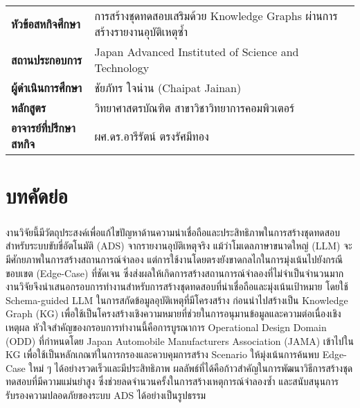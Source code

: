 \documentclass[a4paper,12pt]{report}
\begin{document}
{
\cleardoublepage%
\let\clearpage\relax%
\noindent
\begin{tabular}{l p{10cm}}
    \textbf{หัวข้อสหกิจศึกษา} & การสร้างชุดทดสอบเสริมด้วย Knowledge Graphs ผ่านการสร้างรายงานอุบัติเหตุซ้ำ \vspace{0.2cm} \\
    \textbf{สถานประกอบการ} & Japan Advanced Instituted of Science and Technology \vspace{0.2cm}\\
    \textbf{ผู้ดำเนินการศึกษา} & ชัยภัทร ใจน่าน (Chaipat Jainan) \vspace{0.2cm}\\
    \textbf{หลักสูตร} & วิทยาศาสตรบัณฑิต สาขาวิชาวิทยาการคอมพิวเตอร์ \vspace{0.2cm}\\
    \textbf{อาจารย์ที่ปรึกษาสหกิจ} & ผศ.ดร.อารีรัตน์ ตรงรัศมีทอง \vspace{0.2cm}\\
\end{tabular}

\chapter*{บทคัดย่อ}

\paragraph{}
งานวิจัยนี้มีวัตถุประสงค์เพื่อแก้ไขปัญหาด้านความน่าเชื่อถือและประสิทธิภาพในการสร้างชุดทดสอบสำหรับระบบขับขี่อัตโนมัติ (ADS) จากรายงานอุบัติเหตุจริง แม้ว่าโมเดลภาษาขนาดใหญ่ (LLM) จะมีศักยภาพในการสร้างสถานการณ์จำลอง แต่การใช้งานโดยตรงยังขาดกลไกในการมุ่งเน้นไปยังกรณีขอบเขต (Edge-Case) ที่ชัดเจน ซึ่งส่งผลให้เกิดการสร้างสถานการณ์จำลองที่ไม่จำเป็นจำนวนมาก งานวิจัยจึงนำเสนอกรอบการทำงานสำหรับการสร้างชุดทดสอบที่น่าเชื่อถือและมุ่งเน้นเป้าหมาย โดยใช้ Schema-guided LLM ในการสกัดข้อมูลอุบัติเหตุที่มีโครงสร้าง ก่อนนำไปสร้างเป็น Knowledge Graph (KG) เพื่อใช้เป็นโครงสร้างเชิงความหมายที่ช่วยในการอนุมานข้อมูลและความต่อเนื่องเชิงเหตุผล หัวใจสำคัญของกรอบการทำงานนี้คือการบูรณาการ Operational Design Domain (ODD) ที่กำหนดโดย Japan Automobile Manufacturers Association (JAMA) เข้าไปใน KG เพื่อใช้เป็นหลักเกณฑ์ในการกรองและควบคุมการสร้าง Scenario ให้มุ่งเน้นการค้นพบ Edge-Case ใหม่ ๆ ได้อย่างรวดเร็วและมีประสิทธิภาพ ผลลัพธ์ที่ได้คือก้าวสำคัญในการพัฒนาวิธีการสร้างชุดทดสอบที่มีความแม่นยำสูง ซึ่งช่วยลดจำนวนครั้งในการสร้างเหตุการณ์จำลองซ้ำ และสนับสนุนการรับรองความปลอดภัยของระบบ ADS ได้อย่างเป็นรูปธรรม
}
\end{document}
